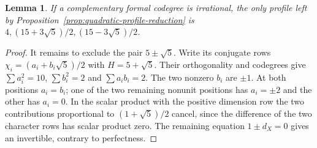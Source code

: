 \documentclass[11pt,a4paper]{article}
\newtheorem{lemma}[theorem]{Lemma}
\numberwithin{equation}{section}
\begin{document}
\begin{lemma}\label{lem:quadratic-mixed-profile}
If a complementary formal codegree is irrational, the only profile
left by Proposition~\ref{prop:quadratic-profile-reduction} is
$4,(15+3\sqrt5)/2,(15-3\sqrt5)/2$.
\end{lemma}
\begin{proof}
It remains to exclude the pair $5\pm\sqrt5$. Write its conjugate rows
$\chi_i=(a_i+b_i\sqrt5)/2$ with $H=5+\sqrt5$.
Their orthogonality and codegrees give
$\sum a_i^2=10$, $\sum b_i^2=2$ and $\sum a_i b_i=2$.
The two nonzero $b_i$ are $\pm1$. At both positions $a_i=b_i$;
one of the two remaining nonunit positions has $a_i=\pm2$ and
the other has $a_i=0$. In the scalar product with the positive
dimension row the two contributions proportional to
$(1+\sqrt5)/2$ cancel, since the difference of the two character
rows has scalar product zero. The remaining equation
$1\pm d_X=0$ gives an invertible, contrary to perfectness.
\end{proof}
\end{document}
